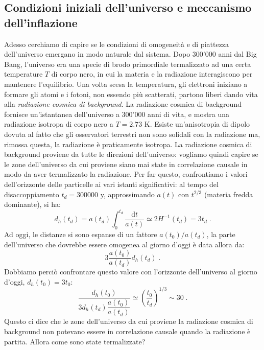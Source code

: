 \documentclass[12pt,a4paper]{report}
\theoremstyle{definition}
\newcommand{\diff}[1][]{\mathrm{d}#1}
\begin{document}
\subsection{Condizioni iniziali dell'universo e meccanismo dell'inflazione}
Adesso cerchiamo di capire se le condizioni di omogeneità e di piattezza dell'universo emergano in modo naturale dal sistema. Dopo 300'000 anni dal Big Bang, l'universo era una specie di brodo primordiale termalizzato ad una certa temperature $T$ di corpo nero, in cui la materia e la radiazione interagiscono per mantenere l'equilibrio. Una volta scesa la temperatura, gli elettroni iniziano a formare gli atomi e i fotoni, non essendo più scatterati, partono liberi dando vita alla \emph{radiazione cosmica di background}. La radiazione cosmica di background fornisce un'istantanea dell'universo a 300'000 anni di vita, e mostra una radiazione isotropa di corpo nero a $T=2.73$ K. Esiste un'anisotropia di dipolo dovuta al fatto che gli osservatori terrestri non sono solidali con la radiazione ma, rimossa questa, la radiazione è praticamente isotropa. La radiazione cosmica di background proviene da tutte le direzioni dell'universo: vogliamo quindi capire se le zone dell'universo da cui proviene siano mai state in correlazione causale in modo da aver termalizzato la radiazione. Per far questo, confrontiamo i valori dell'orizzonte delle particelle ai vari istanti significativi: al tempo del disaccoppiamento $t_d=300000$ y, approssimando $a(t)$ con $t^{2/3}$ (materia fredda dominante), si ha:
\begin{equation}
d_h(t_d)=a(t_d)\int_0^{t_d}\frac{\diff{t}}{a(t)}\simeq 2H^{-1}(t_d)=3t_d\;.
\end{equation}
Ad oggi, le distanze si sono espanse di un fattore $a(t_0)/a(t_d)$, la parte dell'universo che dovrebbe essere omogenea al giorno d'oggi è data allora da:
\begin{equation}
3\frac{a(t_0)}{a(t_d)}d_h(t_d)\;.
\end{equation}
Dobbiamo perciò confrontare questo valore con l'orizzonte dell'universo al giorno d'oggi, $d_h(t_0)=3t_0$:
\begin{equation}
\frac{d_h(t_0)}{3d_h(t_d)\dfrac{a(t_0)}{a(t_d)}}\simeq \left(\frac{t_0}{t_d}\right)^{1/3}\sim 30\;.
\end{equation}
Questo ci dice che le zone dell'universo da cui proviene la radiazione cosmica di background non potevano essere in correlazione causale quando la radiazione è partita. Allora come sono state termalizzate? \\
\\
\end{document}
